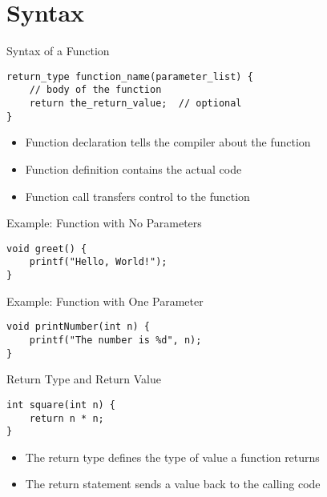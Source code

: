 \documentclass[12pt, aspectratio=169]{beamer}
\begin{document}
    \section{Syntax}


    \begin{frame}[fragile]{Syntax of a Function}
        \begin{verbatim}
return_type function_name(parameter_list) {
    // body of the function
    return the_return_value;  // optional
}
        \end{verbatim}

        \begin{itemize}
            \item Function declaration tells the compiler about the function
            \item Function definition contains the actual code
            \item Function call transfers control to the function
        \end{itemize}
    \end{frame}


    \begin{frame}[fragile]{Example: Function with No Parameters}
        \begin{verbatim}
void greet() {
    printf("Hello, World!");
}
        \end{verbatim}
    \end{frame}


    \begin{frame}[fragile]{Example: Function with One Parameter}
        \begin{verbatim}
void printNumber(int n) {
    printf("The number is %d", n);
}
        \end{verbatim}
    \end{frame}


    \begin{frame}[fragile]{Return Type and Return Value}
        \begin{verbatim}
int square(int n) {
    return n * n;
}
        \end{verbatim}


        \begin{itemize}
            \item The return type defines the type of value a function returns
            \item The return statement sends a value back to the calling code
        \end{itemize}
    \end{frame}
\end{document}
